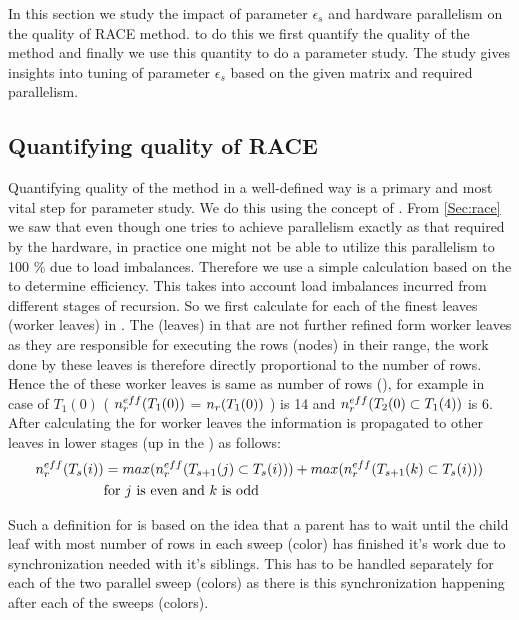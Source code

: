 
In this section we study the impact of parameter $\epsilon_s$ and hardware parallelism on the quality of  RACE method. \Inorder to do this we first quantify the quality of the method and finally we  use this quantity to do a parameter study. The study gives insights into tuning of parameter $\epsilon_s$ based on the given matrix and required parallelism.


\subsection{Quantifying quality of RACE}
Quantifying quality of the method in a well-defined way is a primary and most vital step for parameter study. We do this using the concept of \effPar. From \cref{Sec:race} we saw that even though one tries to achieve parallelism exactly as that required by the hardware, in practice one might not be able to utilize this parallelism to 100 \% due to load imbalances. Therefore we use a simple calculation based on the \levelTree to determine efficiency. This takes into account load imbalances incurred from different stages of recursion. So we first calculate \effRow for each of the finest leaves (worker leaves) in \levelTree.
The \levelGroups (leaves) in \levelTree that are not further refined form worker leaves as they are responsible for executing the rows (nodes) in their range, the work done by these leaves is therefore directly proportional to the number of rows. Hence the \effRow of these worker leaves is same as number of rows (\nrows), for example in case of $T_1(0)$ \effRow ( $n_{r}^{eff}(T_1(0))$ = $n_{r}(T_1(0))$ ) is 14 and $n_{r}^{eff}(T_2(0) \subset T_1(4))$ is 6. After calculating the \effRow for worker leaves the information is propagated to other leaves in lower stages (up in the \levelTree) as follows: 
\begin{align*}
n_{r}^{eff}(T_s(i)) &= max(n_{r}^{eff}(T_{s+1}(j) \subset T_s(i))) + max(n_{r}^{eff}(T_{s+1}(k) \subset T_s(i)))\\
 & \text{for } j \text{ is even and } k \text{ is odd}
\end{align*}

Such a definition for \effRow is based on the idea that a parent has to wait until the child leaf with most number of rows in each sweep (color) has finished it's work due to synchronization needed with it's siblings. This has to be handled separately for each of the two parallel sweep (colors) as there is this synchronization happening after each of the sweeps (colors). 


